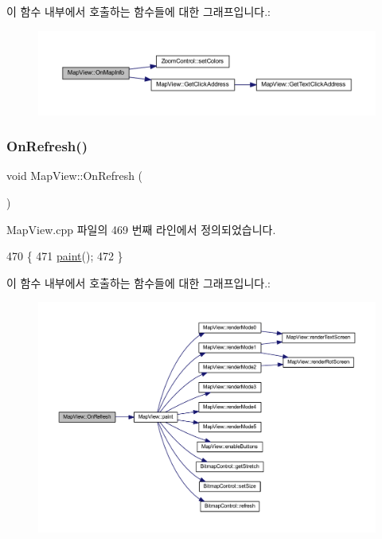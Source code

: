 이 함수 내부에서 호출하는 함수들에 대한 그래프입니다.\+:
\nopagebreak
\begin{figure}[H]
\begin{center}
\leavevmode
\includegraphics[width=350pt]{class_map_view_a9d5b068db40e4d9641bfeca9f81bb53a_cgraph}
\end{center}
\end{figure}
\mbox{\label{class_map_view_aecebb6b2f85810fad29d3e26e125036f}} 
\subsubsection{\texorpdfstring{On\+Refresh()}{OnRefresh()}}
{\footnotesize\ttfamily void Map\+View\+::\+On\+Refresh (\begin{DoxyParamCaption}{ }\end{DoxyParamCaption})\hspace{0.3cm}{\ttfamily [protected]}}



Map\+View.\+cpp 파일의 469 번째 라인에서 정의되었습니다.


\begin{DoxyCode}
470 \{
471   \mbox{\hyperlink{class_map_view_a89edf3053cffa4a68516178dbd987339}{paint}}();  
472 \}
\end{DoxyCode}
이 함수 내부에서 호출하는 함수들에 대한 그래프입니다.\+:
\nopagebreak
\begin{figure}[H]
\begin{center}
\leavevmode
\includegraphics[width=350pt]{class_map_view_aecebb6b2f85810fad29d3e26e125036f_cgraph}
\end{center}
\end{figure}
\mbox{\label{class_map_view_a3fc9d61706da44e2fd3e8762805d9f0b}} 
